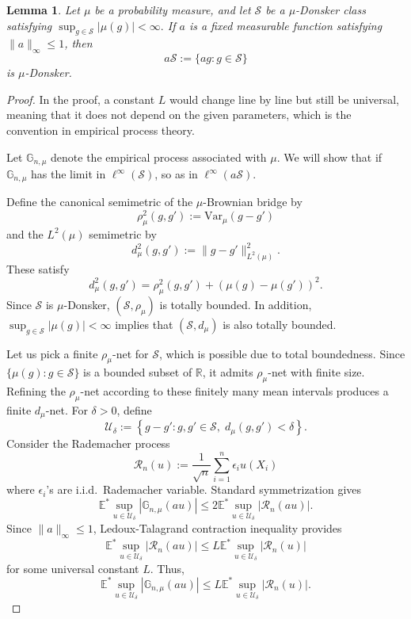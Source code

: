 \documentclass{amsart}
\theoremstyle{plain}
\numberwithin{equation}{section}\newtheorem{theorem}{Theorem}[section]
\newtheorem{lemma}[theorem]{Lemma}
\theoremstyle{remark}
\newcommand{\norm}[1]{\lVert #1 \rVert}
\begin{document}
\begin{lemma}\label{lem: donkser_lemma}
Let $\mu$ be a probability measure, and let $\mathcal{S}$ be a
$\mu$-Donsker class satisfying $\sup_{g\in\mathcal{S}}|\mu(g)|<\infty.$ If $a$ is a fixed measurable function satisfying $\norm{a}_{\infty}\leq 1$, then
\[
    a\mathcal{S}:= \{ag:g\in\mathcal{S}\}
\]
is $\mu$-Donsker.
\end{lemma}





\begin{proof}
In the proof, a constant $L$ would change line by line but still be universal, meaning that it does not depend on the given parameters, which is the convention in empirical process theory.



Let $\mathbb{G}_{n,\mu}$ denote the empirical process associated with $\mu$. We will show that if $\mathbb{G}_{n,\mu}$ has the limit in $\ell^\infty(\mathcal{S})$, so as in $\ell^\infty(a\mathcal{S})$. 





Define the canonical semimetric of the $\mu$-Brownian bridge by
\[
    \rho^2_\mu(g,g'):=\text{Var}_\mu(g-g')
\]
and the $L^2(\mu)$ semimetric by
\[
    d^2_\mu(g,g'):= \| g-g' \|^2_{L^2(\mu)}.
\]
These satisfy
\[
    d^2_\mu(g,g')=\rho^2_\mu(g,g') + \left(\mu (g) -\mu(g') \right)^2.
\]
Since $\mathcal{S}$ is $\mu$-Donsker,
$(\mathcal{S},\rho_\mu)$ is totally bounded. In addition, $\sup_{g\in\mathcal{S}}|\mu(g)|<\infty$ implies that $(\mathcal{S},d_\mu)$ is also totally bounded.





Let us pick a finite
$\rho_\mu$-net for $\mathcal{S}$, which is possible due to total boundedness. Since $\{\mu(g):g\in\mathcal{S}\}$ is a bounded subset of $\mathbb R$, it admits $\rho_\mu$-net with finite size. Refining the $\rho_\mu$-net according to these finitely
many mean intervals produces a finite $d_\mu$-net. For $\delta>0$, define
\[
    \mathcal U_\delta:=\left\{g-g': g,g'\in\mathcal{S},\; d_\mu(g,g')<\delta \right\}.
\]
Consider the Rademacher process
\[
    \mathcal{R}_n (u) := \frac{1}{\sqrt{n}}\sum_{i=1}^n \epsilon_i u(X_i)
\]
where $\epsilon_i$'s are i.i.d.\ Rademacher variable. Standard symmetrization gives
\[
    \mathbb{E}^* \sup_{u\in\mathcal U_\delta}
\left|
    \mathbb{G}_{n,\mu}(au) \right| \leq 2 \mathbb{E}^* \sup_{u\in\mathcal U_\delta}
\left|
    \mathcal{R}_n (au) \right|.
\]
Since $\| a \|_\infty \leq 1$, Ledoux-Talagrand contraction inequality \cite[Theorem 4.12]{ledoux1991probability} provides
\[
    \mathbb{E}^* \sup_{u\in\mathcal U_\delta}
\left|
    \mathcal{R}_n (au) \right| \leq L \mathbb{E}^* \sup_{u\in\mathcal U_\delta}
\left|
    \mathcal{R}_n (u) \right|
\]
for some universal constant $L$. Thus,
\[
    \mathbb{E}^* \sup_{u\in\mathcal U_\delta}
\left|
    \mathbb{G}_{n,\mu}(au) \right| \leq L \mathbb{E}^* \sup_{u\in\mathcal U_\delta}
\left|
    \mathcal{R}_n (u) \right|.
\]




\end{proof}
\end{document}
